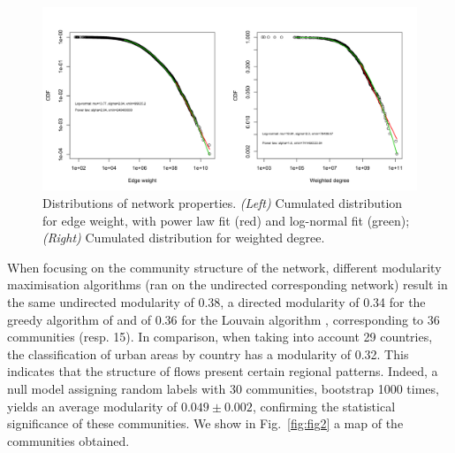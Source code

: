\documentclass[10pt,letterpaper]{article}
\begin{document}
\begin{figure}
    \begin{center}
        \includegraphics[width=\linewidth]{figures/Fig1.png}
    \end{center}
    \caption{Distributions of network properties. \textit{(Left)} Cumulated distribution for edge weight, with power law fit (red) and log-normal fit (green); \textit{(Right)} Cumulated distribution for weighted degree.}
    \label{fig:nwdist}
\end{figure}


When focusing on the community structure of the network, different modularity maximisation algorithms (ran on the undirected corresponding network) result in the same undirected modularity of 0.38, a directed modularity \cite{nicosia2009extending} of 0.34 for the greedy algorithm of \cite{clauset2004finding} and of 0.36 for the Louvain algorithm \cite{blondel2008fast}, corresponding to 36 communities (resp. 15). In comparison, when taking into account 29 countries, the classification of urban areas by country has a modularity of 0.32. This indicates that the structure of flows present certain regional patterns. Indeed, a null model assigning random labels with 30 communities, bootstrap 1000 times, yields an average modularity of $0.049 \pm 0.002$, confirming the statistical significance of these communities. We show in Fig.~\ref{fig:fig2} a map of the communities obtained.
\end{document}
